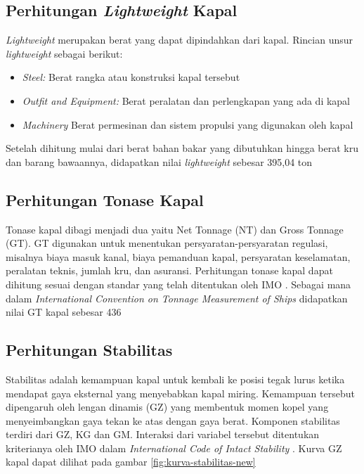 \subsection{Perhitungan \emph{Lightweight} Kapal}
\label{subsec:perhitungan-lwt}

\emph{Lightweight} merupakan berat yang dapat dipindahkan dari kapal. Rincian unsur \emph{lightweight} sebagai berikut:
\begin{itemize}
    \item \emph{Steel:} Berat rangka atau konstruksi kapal tersebut
    \item \emph{Outfit and Equipment:} Berat peralatan dan perlengkapan yang ada di kapal  
    \item \emph{Machinery} Berat permesinan dan sistem propulsi yang digunakan oleh kapal
\end{itemize}

Setelah dihitung mulai dari berat bahan bakar yang dibutuhkan hingga berat kru dan barang bawaannya, didapatkan nilai \emph{lightweight} sebesar 395,04 ton


\subsection{Perhitungan Tonase Kapal}
\label{subsec:perhitungan-gt}

Tonase kapal dibagi menjadi dua yaitu Net Tonnage (NT) dan Gross Tonnage (GT).  GT digunakan untuk menentukan persyaratan-persyaratan regulasi, misalnya biaya masuk kanal, biaya pemanduan kapal, persyaratan keselamatan, peralatan teknis, jumlah kru, dan asuransi. Perhitungan tonase kapal dapat dihitung sesuai dengan standar yang telah ditentukan oleh IMO \citep{Organization_1983}. Sebagai mana dalam \emph{International Convention on Tonnage Measurement of Ships} didapatkan nilai GT kapal sebesar 436


\subsection{Perhitungan Stabilitas}
\label{subsec:stabilitas}

Stabilitas adalah kemampuan kapal untuk kembali ke posisi tegak lurus ketika mendapat gaya eksternal yang menyebabkan kapal miring. Kemampuan tersebut dipengaruh oleh lengan dinamis (GZ)
yang membentuk momen kopel yang menyeimbangkan gaya tekan ke atas dengan gaya berat. Komponen stabilitas terdiri dari GZ, KG dan GM. Interaksi dari variabel tersebut ditentukan kriterianya oleh IMO dalam \emph{International Code of Intact Stability} \citep{Organization_2009}. Kurva GZ kapal dapat dilihat pada gambar \ref{fig:kurva-stabilitas-new}

